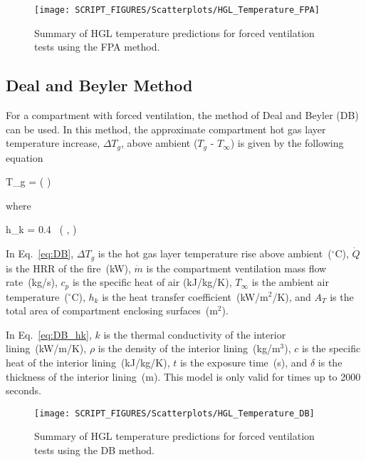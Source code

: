 \begin{figure}[h]
\begin{center}
\texttt{[image: SCRIPT\_FIGURES/Scatterplots/HGL\_Temperature\_FPA]}
\end{center}
\caption[Summary of HGL temperature predictions for forced ventilation tests (FPA)]
{Summary of HGL temperature predictions for forced ventilation tests using the FPA method.}
\label{HGL_Summary_Forced_Ventilation_FPA}
\end{figure}

\clearpage


\subsection{Deal and Beyler Method}

For a compartment with forced ventilation, the method of Deal and Beyler (DB) can be used. In this method, the approximate compartment hot gas layer temperature increase, $\Delta T_g$, above ambient ($T_g$ - $T_\infty$) is given by the following equation

\be
\Delta T_g = \left(  \right)
\label{eq:DB}
\ee

\noindent where

\be
h_k = 0.4\  \left(  ,  \right)
\label{eq:DB_hk}
\ee

In Eq.~\ref{eq:DB}, $\Delta T_g$ is the hot gas layer temperature rise above ambient~($^\circ$C), $\dot Q$ is the HRR of the fire~(kW), $\dot m$ is the compartment ventilation mass flow rate~(kg/s), $c_p$ is the specific heat of air (kJ/kg/K), $T_\infty$ is the ambient air temperature~($^\circ$C), $h_k$ is the heat transfer coefficient~(kW/m$^2$/K), and $A_T$ is the total area of compartment enclosing surfaces~(m$^2$).

In Eq.~\ref{eq:DB_hk}, $k$ is the thermal conductivity of the interior lining~(kW/m/K), $\rho$ is the density of the interior lining~(kg/m$^3$), $c$ is the specific heat of the interior lining~(kJ/kg/K), $t$ is the exposure time~(s), and $\delta$ is the thickness of the interior lining~(m). This model is only valid for times up to 2000 seconds.

\begin{figure}[ht]
\begin{center}
\texttt{[image: SCRIPT\_FIGURES/Scatterplots/HGL\_Temperature\_DB]}
\end{center}
\caption[Summary of HGL temperature predictions for forced ventilation tests (DB)]
{Summary of HGL temperature predictions for forced ventilation tests using the DB method.}
\label{HGL_Summary_Forced_Ventilation_DB}
\end{figure}

